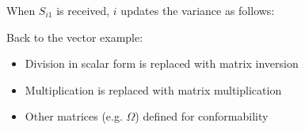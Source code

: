 \documentclass[aspectratio=169]{beamer}
\begin{document}
\begin{frame}

When $S_{i1}$ is received, $i$ updates the variance as follows:

\bigskip{}


\bigskip{}


\end{frame}


\begin{frame}
Back to the vector example:
\bigskip\par
\begin{itemize}
\itemsep1.5em
\item<2-> Division in scalar form is replaced with matrix inversion
\item<3-> Multiplication is replaced with matrix multiplication
\item<4-> Other matrices (e.g. $\Omega$) defined for conformability
\end{itemize}

\end{frame}
\end{document}
